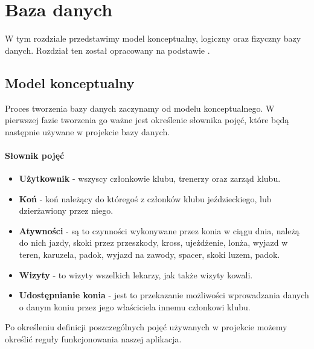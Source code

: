 \documentclass[12pt,oneside]{report}
\begin{document}
\newpage
\chapter{Baza danych}
W tym rozdziale przedstawimy model konceptualny, logiczny oraz fizyczny bazy danych. Rozdział ten został opracowany na podstawie \cite{bazydanych}.
\section{Model konceptualny}
Proces tworzenia bazy danych zaczynamy od modelu konceptualnego. W pierwszej fazie tworzenia go ważne jest określenie słownika pojęć, które będą następnie używane w projekcie bazy danych.
\subsubsection{Słownik pojęć}
\begin{itemize}
	\item \textbf{Użytkownik} - wszyscy członkowie klubu, trenerzy oraz zarząd klubu.
	\item \textbf{Koń} - koń należący do któregoś z członków klubu jeździeckiego, lub dzierżawiony przez niego.
	\item \textbf{Atywności} - są to czynności wykonywane przez konia w ciągu dnia, należą do nich jazdy, skoki przez przeszkody, kross, ujeżdżenie, lonża, wyjazd w teren, karuzela, padok, wyjazd na zawody, spacer, skoki luzem, padok.
	\item \textbf{Wizyty} - to wizyty wszelkich lekarzy, jak także wizyty kowali.
	\item \textbf{Udostępnianie konia} - jest to przekazanie możliwości wprowadzania danych o danym koniu przez jego właściciela innemu członkowi klubu.
	
\end{itemize}
\newpage
Po określeniu definicji poszczególnych pojęć używanych w projekcie możemy określić reguły funkcjonowania naszej aplikacja.
\end{document}
